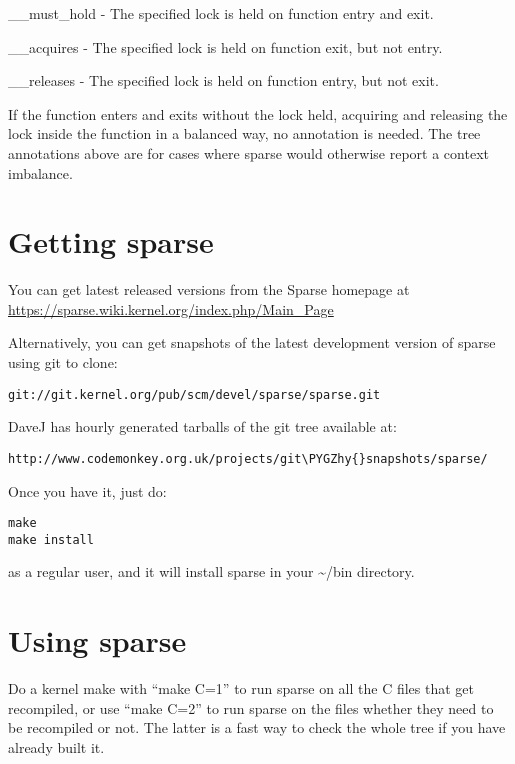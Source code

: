 \documentclass[a4paper,8pt,english]{sphinxmanual}
\def\PYGZhy{\char`\-}
\begin{document}
\_\_must\_hold - The specified lock is held on function entry and exit.

\_\_acquires - The specified lock is held on function exit, but not entry.

\_\_releases - The specified lock is held on function entry, but not exit.

If the function enters and exits without the lock held, acquiring and
releasing the lock inside the function in a balanced way, no
annotation is needed.  The tree annotations above are for cases where
sparse would otherwise report a context imbalance.


\section{Getting sparse}
\label{dev-tools/sparse:getting-sparse}
You can get latest released versions from the Sparse homepage at
\url{https://sparse.wiki.kernel.org/index.php/Main\_Page}

Alternatively, you can get snapshots of the latest development version
of sparse using git to clone:

\begin{Verbatim}[commandchars=\\\{\}]
git://git.kernel.org/pub/scm/devel/sparse/sparse.git
\end{Verbatim}

DaveJ has hourly generated tarballs of the git tree available at:

\begin{Verbatim}[commandchars=\\\{\}]
http://www.codemonkey.org.uk/projects/git\PYGZhy{}snapshots/sparse/
\end{Verbatim}

Once you have it, just do:

\begin{Verbatim}[commandchars=\\\{\}]
make
make install
\end{Verbatim}

as a regular user, and it will install sparse in your \textasciitilde{}/bin directory.


\section{Using sparse}
\label{dev-tools/sparse:using-sparse}
Do a kernel make with ``make C=1'' to run sparse on all the C files that get
recompiled, or use ``make C=2'' to run sparse on the files whether they need to
be recompiled or not.  The latter is a fast way to check the whole tree if you
have already built it.
\end{document}
